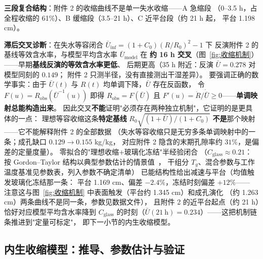 \documentclass[12pt,a4paper]{ctexart}
\numberwithin{equation}{section}
\begin{document}
\textbf{三段复合结构}：附件 2 的收缩曲线不是单一失水收缩——A 急缩段
（0--3.5 h，占全程收缩的 61\%）、B 缓缩段（3.5--21 h）、C 近平台段（约 21 h 起，
平台 1.198 cm）。

\textbf{滞后交叉诊断}：在失水等容闭合 $\bar U_{\mathrm{inf}}=(1+C_0)(R/R_0)^2-1$ 下
反演附件 2 的基线等效含水率，与模型平均含水率 $\bar U_{\mathrm{model}}$ 在
\textbf{约 16 h 交叉}（图~\ref{fig:收缩机制}）——早期\textbf{基线反演的等效含水率更低}、
后期更高（35 h 附近：反演 $\bar U=0.278$ 对模型同刻的 $0.149$；
附件 2 只测半径，没有直接测出干湿差异）。
要强调正确的数学事实：由于 $\bar U(t)$ 与 $R(t)$ 均单调下降，$\bar U$ 存在反函数，
令 $F(u)=R_{\mathrm{obs}}(\bar U^{-1}(u))$ 即得 $R_{\mathrm{obs}}=F(\bar U)$ 且
$F'(u)=\dot R/\dot{\bar U}\ge0$——\textbf{单调映射总能构造出来}。
因此交叉\textbf{不能}证明"必须存在两种独立机制"，它证明的是更具体的一点：
理想等容收缩这条\textbf{特定基线} $R_0\sqrt{(1+\bar U)/(1+C_0)}$
\textbf{不是}那个映射——它不能解释附件 2 的全部数据
（失水等容收缩只是无穷多条单调映射中的一条；成孔缺口 $0.129\to0.155$ kg/kg，
对应附件 2 隐含的末期孔隙率约 $31\%$，是偏差的定量度量）。
零拟合的"理想收缩+玻璃化冻结"半经验闭合
（$C_{\mathrm{glass}}\approx0.21$：按 Gordon--Taylor 结构以典型参数估计的情景值~\cite{saravacos}，
干组分 $T_g$、混合参数与工作温度基准见参数表，列入参数不确定清单）
已能结构性给出减速与平台（均值触发玻璃化冻结那一条：
平台 1.169 cm、偏差 $-2.4\%$，冻结时刻偏差 $+12\%$——
注意这与图~\ref{fig:收缩机制} 中表面触发（平台约 1.345 cm）和成孔演化
（约 1.263 cm）两条曲线不是同一条，参数见数据文件），
且附件 2 的近平台起点（约 21 h）恰好对应模型平均含水率降到 $C_{\mathrm{glass}}$
的时刻（$\bar U(21\ \mathrm{h})=0.234$）——这把机制链条推进到"定量可标定"，
即下一小节的内生收缩模型。

\subsection{内生收缩模型：推导、参数估计与验证}\label{sec:内生收缩}
\end{document}
